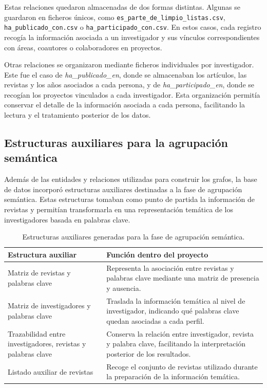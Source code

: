 \documentclass[11pt,spanish,listoffigures,listoftables]{tfgetsinf}
\begin{document}
Estas relaciones quedaron almacenadas de dos formas distintas. Algunas se guardaron en ficheros únicos, como \texttt{es\_parte\_de\_limpio\_listas.csv}, \texttt{ha\_publicado\_con.csv} o \texttt{ha\_participado\_con.csv}. En estos casos, cada registro recogía la información asociada a un investigador y sus vínculos correspondientes con áreas, coautores o colaboradores en proyectos.

Otras relaciones se organizaron mediante ficheros individuales por investigador. Este fue el caso de \textit{ha\_publicado\_en}, donde se almacenaban los artículos, las revistas y los años asociados a cada persona, y de \textit{ha\_participado\_en}, donde se recogían los proyectos vinculados a cada investigador. Esta organización permitía conservar el detalle de la información asociada a cada persona, facilitando la lectura y el tratamiento posterior de los datos.

\subsection{Estructuras auxiliares para la agrupación semántica}

Además de las entidades y relaciones utilizadas para construir los grafos, la base de datos incorporó estructuras auxiliares destinadas a la fase de agrupación semántica. Estas estructuras tomaban como punto de partida la información de revistas y permitían transformarla en una representación temática de los investigadores basada en palabras clave.

\begin{table}[H]
\centering
\small
\renewcommand{\arraystretch}{1.25}
\begin{tabularx}{\textwidth}{
>{\raggedright\arraybackslash}p{4.5cm}
>{\raggedright\arraybackslash}X
}
\toprule
\textbf{Estructura auxiliar} & \textbf{Función dentro del proyecto} \\
\midrule
Matriz de revistas y palabras clave 
& Representa la asociación entre revistas y palabras clave mediante una matriz de presencia y ausencia. \\
\midrule
Matriz de investigadores y palabras clave 
& Traslada la información temática al nivel de investigador, indicando qué palabras clave quedan asociadas a cada perfil. \\
\midrule
Trazabilidad entre investigadores, revistas y palabras clave 
& Conserva la relación entre investigador, revista y palabra clave, facilitando la interpretación posterior de los resultados. \\
\midrule
Listado auxiliar de revistas 
& Recoge el conjunto de revistas utilizado durante la preparación de la información temática. \\
\bottomrule
\end{tabularx}
\caption{Estructuras auxiliares generadas para la fase de agrupación semántica.}
\end{table}
\end{document}
